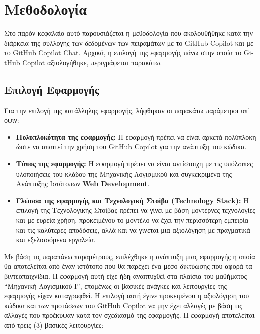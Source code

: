 \chapter{Μεθοδολογία}
\label{ch:chapter3}

Στο παρόν κεφαλαίο αυτό παρουσιάζεται η μεθοδολογία που ακολουθήθηκε
κατά την διάρκεια της σύλλογης των δεδομένων των πειραμάτων με το
\textlatin{GitHub Copilot} και με το \textlatin{GitHub Copilot Chat}.
Αρχικά, η επιλογή της εφαρμογής πάνω στην οποία το \textlatin{GitHub
Copilot} αξιολογήθηκε, περιγράφεται παρακάτω.

\section{Επιλογή Εφαρμογής}

Για την επιλογή της κατάλληλης εφαρμογής, λήφθηκαν οι παρακάτω
παράμετροι υπ' όψιν:

\begin{itemize}
  \item
    \textbf{Πολυπλοκότητα της εφαρμογής:} Η εφαρμογή πρέπει να είναι
    αρκετά πολύπλοκη ώστε να απαιτεί την χρήση του \textlatin{GitHub
    Copilot} για την ανάπτυξη του κώδικα.
  \item
    \textbf{Τύπος της εφαρμογής:} Η εφαρμογή πρέπει να είναι αντίστοιχη
    με τις υπόλoιπες υλοποιήσεις του κλάδου της Μηχανικής
    Λογισμικού και συγκεκριμένα της Ανάπτυξης Ιστότοπων
    \textlatin{\textbf{Web Development}}.
  \item
    \textbf{Γλώσσα της εφαρμογής και Τεχνολογική Στοίβα
    (\textlatin{Technology Stack}):} Η επιλογή της Τεχνολογικής Στοίβας
    πρέπει να γίνει με βάση μοντέρνες τεχνολογίες και με ευρεία χρήση,
    προκειμένου το μοντέλο να έχει την περισσότερη εμπειρία και τις
    καλύτερες αποδόσεις, αλλά και να γίνεται μια αξιολόγηση με πραγματικά
    και εξελισσόμενα εργαλεία.
\end{itemize}

Με βάση τις παραπάνω παραμέτρους, επιλέχθηκε η ανάπτυξη μιας εφαρμογής η
οποία θα αποτελείται από έναν ιστότοπο που θα παρέχει ένα μέσο δικτύωσης
που αφορά τα βιντεοπαιχνίδια. Η εφαρμογή αυτή είχε ήδη αναπτυχθεί στα
πλαίσια του μαθήματος ``Μηχανική Λογισμικού Ι'', επομένως οι βασικές
ανάγκες και λειτουργίες της εφαρμογής είχαν καταγραφθεί. Η επιλογή αυτή
έγινε προκειμένου η αξιολόγηση του κώδικα και των προτάσεων του
\textlatin{GitHub Copilot} να μην έχει αλλαγές με βάση τις αλλαγές που
προέκυψαν κατά τον σχεδιασμό της εφαρμογής. Η εφαρμογή αποτελείται από
τρεις (3) βασικές λειτουργίες:

